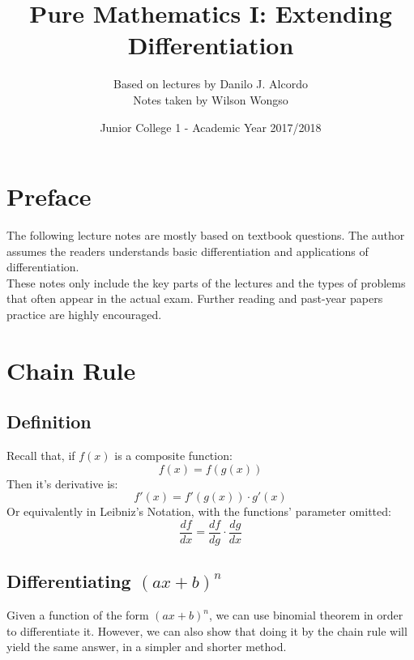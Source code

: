 \documentclass[hidelinks, a4paper, 12pt]{article}
\title{Pure Mathematics I: Extending Differentiation}
\author{Based on lectures by Danilo J. Alcordo \\ Notes taken by Wilson Wongso}
\date{Junior College 1 - Academic Year 2017/2018}
\begin{document}
    

    \maketitle
        
    \tableofcontents

    \section{Preface}
        The following lecture notes are mostly based on textbook \cite{neill2016cambridge} questions. The author assumes the readers understands basic differentiation and applications of differentiation.\\[\baselineskip]
        These notes only include the key parts of the lectures and the types of problems that often appear in the actual exam.
        Further reading and past-year papers practice are highly encouraged.

    \section{Chain Rule}
        \subsection{Definition}
            Recall that, if $f(x)$ is a composite function:
            \[f(x) = f(g(x))\]
            Then it's derivative is:
            \[f'(x) = f'(g(x)) \cdot g'(x)\]
            Or equivalently in Leibniz's Notation, with the functions' parameter omitted:
            \[\frac{df}{dx} = \frac{df}{dg} \cdot \frac{dg}{dx}\]

        \subsection{Differentiating \texorpdfstring{$(ax+b)^n$}{TEXT}}
            Given a function of the form $(ax+b)^n$, we can use binomial theorem in order to differentiate it. However, we can also show that doing it by the 
            chain rule will yield the same answer, in a simpler and shorter method.
\end{document}
